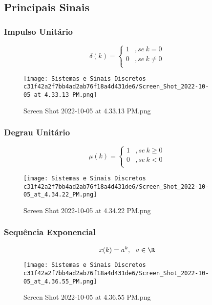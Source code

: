\documentclass[]{article}
\begin{document}
  \hypertarget{principais-sinais}{%
  \subsection{Principais Sinais}\label{principais-sinais}}

  \hypertarget{impulso-unituxe1rio}{%
  \subsubsection{Impulso Unitário}\label{impulso-unituxe1rio}}

  \[
  \delta (k) = \begin{cases}
  1 & ,se \ k =0 \\ 
  0 & ,se \ k \ne0 \\ 
  \end{cases}
  \]

  \begin{figure}
  \centering
  \texttt{[image: Sistemas e Sinais Discretos c31f42a2f7bb4ad2ab76f18a4d431de6/Screen\_Shot\_2022-10-05\_at\_4.33.13\_PM.png]}
  \caption{Screen Shot 2022-10-05 at 4.33.13 PM.png}
  \end{figure}

  \hypertarget{degrau-unituxe1rio}{%
  \subsubsection{Degrau Unitário}\label{degrau-unituxe1rio}}

  \[
  \mu (k) = \begin{cases}
  1 & ,se \ k \ge0 \\ 
  0 & ,se \ k <0 \\ 
  \end{cases}
  \]

  \begin{figure}
  \centering
  \texttt{[image: Sistemas e Sinais Discretos c31f42a2f7bb4ad2ab76f18a4d431de6/Screen\_Shot\_2022-10-05\_at\_4.34.22\_PM.png]}
  \caption{Screen Shot 2022-10-05 at 4.34.22 PM.png}
  \end{figure}

  \hypertarget{sequuxeancia-exponencial}{%
  \subsubsection{Sequência Exponencial}\label{sequuxeancia-exponencial}}

  \[
  x(k) = a^k,  \ \ a\in \R
  \]

  \begin{figure}
  \centering
  \texttt{[image: Sistemas e Sinais Discretos c31f42a2f7bb4ad2ab76f18a4d431de6/Screen\_Shot\_2022-10-05\_at\_4.36.55\_PM.png]}
  \caption{Screen Shot 2022-10-05 at 4.36.55 PM.png}
  \end{figure}
\end{document}

